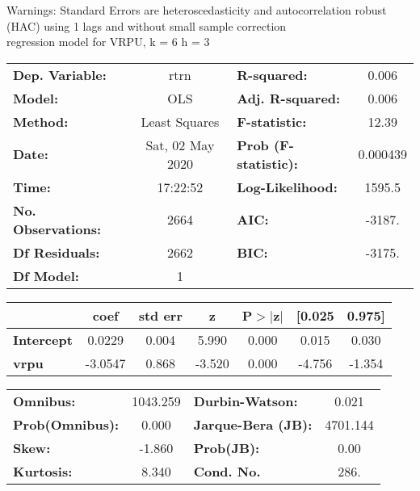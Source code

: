 Warnings: \newline
 [1] Standard Errors are heteroscedasticity and autocorrelation robust (HAC) using 1 lags and without small sample correction\\ 

regression model for VRPU, k = 6 h = 3\begin{center}
\begin{tabular}{lclc}
\toprule
\textbf{Dep. Variable:}    &       rtrn       & \textbf{  R-squared:         } &     0.006   \\
\textbf{Model:}            &       OLS        & \textbf{  Adj. R-squared:    } &     0.006   \\
\textbf{Method:}           &  Least Squares   & \textbf{  F-statistic:       } &     12.39   \\
\textbf{Date:}             & Sat, 02 May 2020 & \textbf{  Prob (F-statistic):} &  0.000439   \\
\textbf{Time:}             &     17:22:52     & \textbf{  Log-Likelihood:    } &    1595.5   \\
\textbf{No. Observations:} &        2664      & \textbf{  AIC:               } &    -3187.   \\
\textbf{Df Residuals:}     &        2662      & \textbf{  BIC:               } &    -3175.   \\
\textbf{Df Model:}         &           1      & \textbf{                     } &             \\
\bottomrule
\end{tabular}
\begin{tabular}{lcccccc}
                   & \textbf{coef} & \textbf{std err} & \textbf{z} & \textbf{P$> |$z$|$} & \textbf{[0.025} & \textbf{0.975]}  \\
\midrule
\textbf{Intercept} &       0.0229  &        0.004     &     5.990  &         0.000        &        0.015    &        0.030     \\
\textbf{vrpu}      &      -3.0547  &        0.868     &    -3.520  &         0.000        &       -4.756    &       -1.354     \\
\bottomrule
\end{tabular}
\begin{tabular}{lclc}
\textbf{Omnibus:}       & 1043.259 & \textbf{  Durbin-Watson:     } &    0.021  \\
\textbf{Prob(Omnibus):} &   0.000  & \textbf{  Jarque-Bera (JB):  } & 4701.144  \\
\textbf{Skew:}          &  -1.860  & \textbf{  Prob(JB):          } &     0.00  \\
\textbf{Kurtosis:}      &   8.340  & \textbf{  Cond. No.          } &     286.  \\
\bottomrule
\end{tabular}
\end{center}

